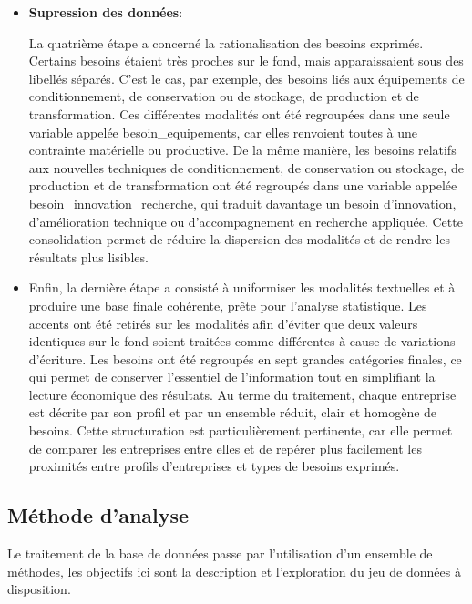 \documentclass[12pt, a4paper, oneside]{report}
\begin{document}
\begin{itemize}
		\item \textbf{Supression des données}:
		
		
		La quatrième étape a concerné la rationalisation des besoins exprimés. Certains besoins étaient très proches sur le fond, mais apparaissaient sous des libellés séparés. C’est le cas, par exemple, des besoins liés aux équipements de conditionnement, de conservation ou de stockage, de production et de transformation. Ces différentes modalités ont été regroupées dans une seule variable appelée besoin\_equipements, car elles renvoient toutes à une contrainte matérielle ou productive. De la même manière, les besoins relatifs aux nouvelles techniques de conditionnement, de conservation ou stockage, de production et de transformation ont été regroupés dans une variable appelée besoin\_innovation\_recherche, qui traduit davantage un besoin d’innovation, d’amélioration technique ou d’accompagnement en recherche appliquée. Cette consolidation permet de réduire la dispersion des modalités et de rendre les résultats plus lisibles.\\
		
		\item 
		Enfin, la dernière étape a consisté à uniformiser les modalités textuelles et à produire une base finale cohérente, prête pour l’analyse statistique. Les accents ont été retirés sur les modalités afin d’éviter que deux valeurs identiques sur le fond soient traitées comme différentes à cause de variations d’écriture. Les besoins ont été regroupés en sept grandes catégories finales, ce qui permet de conserver l’essentiel de l’information tout en simplifiant la lecture économique des résultats. Au terme du traitement, chaque entreprise est décrite par son profil et par un ensemble réduit, clair et homogène de besoins. Cette structuration est particulièrement pertinente, car elle permet de comparer les entreprises entre elles et de repérer plus facilement les proximités entre profils d’entreprises et types de besoins exprimés.
	\end{itemize}
	\subsection{Méthode d'analyse}
	Le traitement de la base de données passe par l’utilisation d’un ensemble de méthodes, les objectifs ici sont la description et l’exploration du jeu de données à disposition. 
\end{document}
